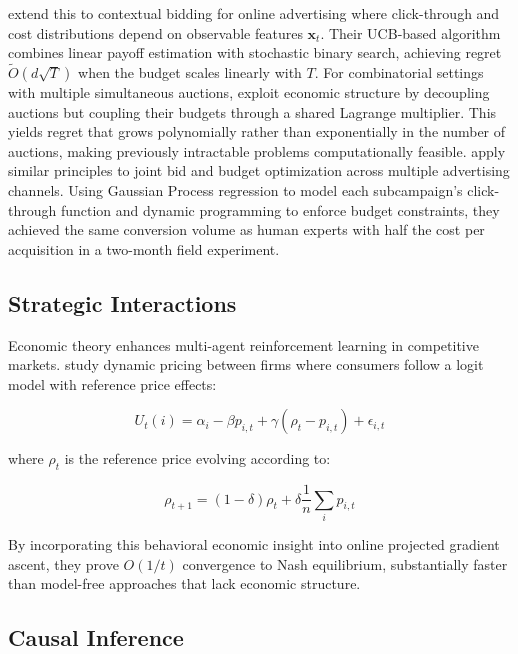 \citet{Flajolet2017} extend this to contextual bidding for online advertising where click-through and cost distributions depend on observable features $\mathbf{x}_t$. Their UCB-based algorithm combines linear payoff estimation with stochastic binary search, achieving regret $\tilde{O}(d\sqrt{T})$ when the budget scales linearly with $T$. For combinatorial settings with multiple simultaneous auctions, \citet{Sankararaman2018} exploit economic structure by decoupling auctions but coupling their budgets through a shared Lagrange multiplier. This yields regret that grows polynomially rather than exponentially in the number of auctions, making previously intractable problems computationally feasible. \citet{Nuara2018} apply similar principles to joint bid and budget optimization across multiple advertising channels. Using Gaussian Process regression to model each subcampaign's click-through function and dynamic programming to enforce budget constraints, they achieved the same conversion volume as human experts with half the cost per acquisition in a two-month field experiment.

\subsection{Strategic Interactions}

Economic theory enhances multi-agent reinforcement learning in competitive markets. \citet{Guo2023} study dynamic pricing between firms where consumers follow a logit model with reference price effects:

\begin{equation}
U_t(i) = \alpha_i - \beta p_{i,t} + \gamma(\rho_t - p_{i,t}) + \epsilon_{i,t}
\end{equation}

where $\rho_t$ is the reference price evolving according to:

\begin{equation}
\rho_{t+1} = (1-\delta)\rho_t + \delta\frac{1}{n}\sum_i p_{i,t}
\end{equation}

By incorporating this behavioral economic insight into online projected gradient ascent, they prove $O(1/t)$ convergence to Nash equilibrium, substantially faster than model-free approaches that lack economic structure.

\subsection{Causal Inference}

